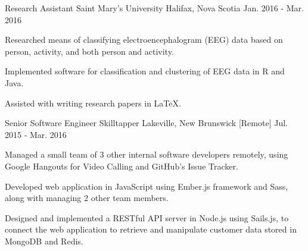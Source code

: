 

\begin{cventries}

  \cventry
    {Research Assistant} %
    {Saint Mary's University} %
    {Halifax, Nova Scotia} %
    {Jan. 2016 - Mar. 2016} %
    {
      \begin{cvitems} %
        \item {Researched means of classifying electroencephalogram (EEG) data based on person, activity, and both person and activity.}
        \item {Implemented software for classification and clustering of EEG data in R and Java.}
        \item {Assisted with writing research papers in LaTeX.}
      \end{cvitems}
    }

  \cventry
    {Senior Software Engineer} %
    {Skilltapper} %
    {Lakeville, New Brunswick [Remote]} %
    {Jul. 2015 - Mar. 2016} %
    {
      \begin{cvitems} %
        \item {Managed a small team of 3 other internal software developers remotely, using Google Hangouts for Video Calling and GitHub's Issue Tracker.}
        \item {Developed web application in JavaScript using Ember.js framework and Sass, along with managing 2 other team members.}
        \item {Designed and implemented a RESTful API server in Node.js using Sails.js, to connect the web application to retrieve and manipulate customer data stored in MongoDB and Redis.}
      \end{cvitems}
    }


\end{cventries}

